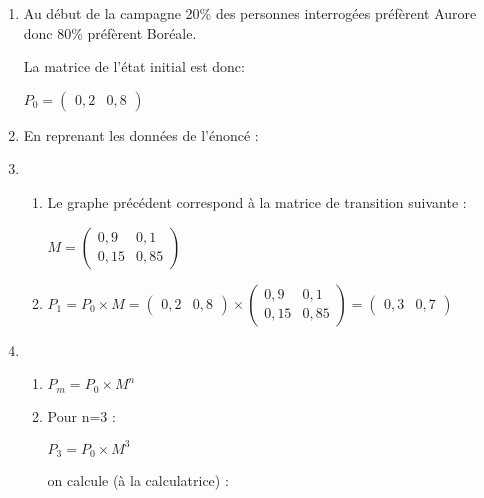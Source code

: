 \begin{corrige}
     \begin{enumerate}
          \item
          Au début de la campagne 20\% des personnes interrogées préfèrent Aurore donc 80\% préfèrent Boréale.
          \par
          La matrice de l'état initial est donc:
          \par
          $P_{0}=\begin{pmatrix}0,2 & 0,8\end{pmatrix}$
          \item
          En reprenant les données de l'énoncé :


\begin{center}
\end{center}
          \item
          \begin{enumerate}[label=\alph*.]
               \item
               Le graphe précédent correspond à la matrice de transition suivante :
               \par
               $M=\begin{pmatrix} 0,9 & 0,1  \\ 0,15 & 0,85 \end{pmatrix}$
               \item
               $P_{1}=P_{0}\times M=\begin{pmatrix}0,2 & 0,8\end{pmatrix}\times \begin{pmatrix} 0,9 & 0,1  \\ 0,15 & 0,85 \end{pmatrix}=\begin{pmatrix}0,3 & 0,7\end{pmatrix}$
          \end{enumerate}
          \item
          \begin{enumerate}[label=\alph*.]
               \item
               $P_{m}=P_{0}\times M^{n}$
               \item
               Pour n=3 :
               \par
               $P_{3}=P_{0}\times M^{3}$
               \par
               on calcule (à la calculatrice) :
               \par

\end{enumerate}
\end{enumerate}
\end{corrige}
